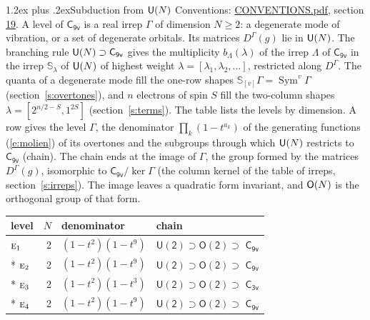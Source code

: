 \documentclass[10pt,a4paper]{article}
\makeatletter
\renewcommand\section{\@startsection{section}{1}{\z@}{-3ex plus -1ex minus -.2ex}%
  {1.2ex plus .2ex}{\normalfont\large\sffamily\bfseries\color{parttitle}}}
\numberwithin{equation}{section}
\newcommand{\grp}[1]{\mathsf{#1}}
\newcommand{\irr}[1]{\text{\normalfont\scshape #1}}
\newcommand{\repD}[1]{D^{#1}}
\newcommand{\schur}[1]{\mathbb{S}_{#1}}
\newcommand{\shape}[1]{[#1]}
\makeatother
\begin{document}
\section{Subduction from \texorpdfstring{$\grp{U(\mathnormal{N})}$}{U(N)}}\label{s:unitary}
Conventions: \href{../../CONVENTIONS.pdf}{CONVENTIONS.pdf}, section \href{../../CONVENTIONS.pdf\#conv.19}{19}.
\leavevmode\label{n:local.level.dimension}A level of $\grp{C_{9v}}$ is a real irrep $\Gamma$ of dimension $N \ge 2$: a degenerate mode of vibration, or a set of degenerate orbitals. \label{n:group.unitary}Its matrices $\repD{\Gamma}(g)$ lie in $\grp{U(\mathnormal{N})}$. \label{n:irrep.schur}\label{n:shape.partition}\label{n:local.partition}\label{n:function.multiplicity.unitary}The branching rule $\grp{U(\mathnormal{N})} \supset \grp{C_{9v}}$ gives the multiplicity $b_\Lambda(\lambda)$ of the irrep $\Lambda$ of $\grp{C_{9v}}$ in the irrep $\schur{\lambda}$ of $\grp{U(\mathnormal{N})}$ of highest weight $\lambda = \shape{\lambda_1, \lambda_2, \dots}$, restricted along $\repD{\Gamma}$. \label{n:local.partition.power}\label{n:local.electrons}\label{n:local.spin}The quanta of a degenerate mode fill the one-row shapes $\schur{\shape{v}}\Gamma = \operatorname{Sym}^{v}\Gamma$ (section~\ref{s:overtones}), and $n$ electrons of spin $S$ fill the two-column shapes $\lambda = \shape{2^{n/2-S}, 1^{2S}}$ (section~\ref{s:terms}).
The table lists the levels by dimension. \label{n:head.level}\label{n:head.denominator}\label{n:index.overtone.denominator}\label{n:head.chain}A row gives the level $\Gamma$, the denominator $\prod_k (1 - t^{a_k})$ of the generating functions (\ref{e:molien}) of its overtones and the subgroups through which $\grp{U(\mathnormal{N})}$ restricts to $\grp{C_{9v}}$ (chain). The chain ends at the image of $\Gamma$, the group formed by the matrices $\repD{\Gamma}(g)$, isomorphic to $\grp{C_{9v}}/\ker\Gamma$ (the column kernel of the table of irreps, section~\ref{s:irreps}). The image leaves a quadratic form invariant, and $\grp{O(\mathnormal{N})}$ is the orthogonal group of that form.
{\small\begin{longtable}{@{}lrll@{}}\toprule
level & $N$ & denominator & chain\\\midrule\endhead
\bottomrule\endfoot\endlastfoot
$\irr{e}_{1}$ & 2 & $(1-t^{2})(1-t^{9})$ & $\grp{U(2)} \supset \grp{O(2)} \supset$ \href{C9v.pdf}{$\grp{C_{9v}}$}\\*
$\irr{e}_{2}$ & 2 & $(1-t^{2})(1-t^{9})$ & $\grp{U(2)} \supset \grp{O(2)} \supset$ \href{C9v.pdf}{$\grp{C_{9v}}$}\\*
$\irr{e}_{3}$ & 2 & $(1-t^{2})(1-t^{3})$ & $\grp{U(2)} \supset \grp{O(2)} \supset$ \href{C3v.pdf}{$\grp{C_{3v}}$}\\*
$\irr{e}_{4}$ & 2 & $(1-t^{2})(1-t^{9})$ & $\grp{U(2)} \supset \grp{O(2)} \supset$ \href{C9v.pdf}{$\grp{C_{9v}}$}\\
\bottomrule\end{longtable}}
\end{document}
